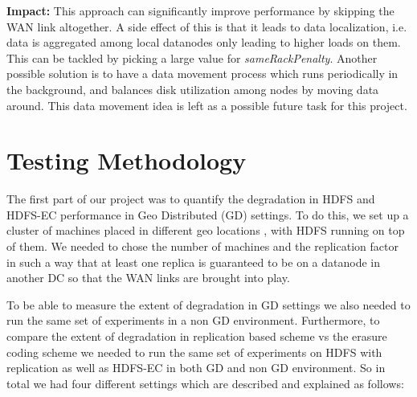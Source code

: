 \documentclass{sig-alternate-05-2015}
\begin{document}
\textbf{Impact:} This approach can significantly improve performance by skipping the WAN link altogether. A side effect of this is that it leads to data localization, i.e. data is aggregated among local datanodes only leading to higher loads on them. This can be tackled by picking a large value for \emph{sameRackPenalty}. Another possible solution is to have a data movement process which runs periodically in the background, and balances disk utilization among nodes by moving data around. This data movement idea is left as a possible future task for this project.

\section{Testing Methodology}
The first part of our project was to quantify the degradation in HDFS and HDFS-EC performance in Geo Distributed (GD) settings. To do this, we set up a cluster of machines placed in different geo locations , with HDFS running on top of them. We needed to chose the number of machines and the replication factor in such a way that at least one replica is guaranteed to be on a datanode in another DC so that the WAN links are brought into play. 

To be able to measure the extent of degradation in GD settings we also needed to run the same set of experiments in a non GD environment. Furthermore, to compare the extent of degradation in replication based scheme vs the erasure coding scheme we needed to run the same set of experiments on HDFS with replication as well as HDFS-EC in both GD and non GD environment. So in total we had four different settings which are described and explained as follows:
\end{document}
